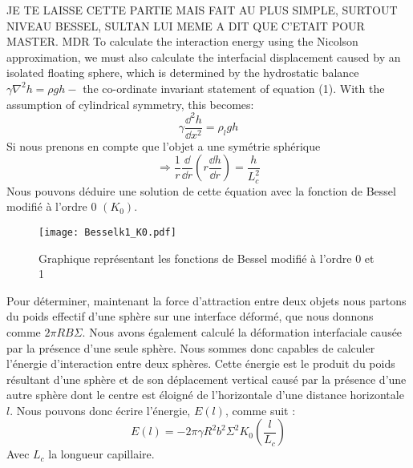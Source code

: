         JE TE LAISSE CETTE PARTIE MAIS FAIT AU PLUS SIMPLE, SURTOUT NIVEAU BESSEL, SULTAN LUI MEME A DIT QUE C'ETAIT POUR MASTER. MDR 
        To calculate the interaction energy using the Nicolson approximation, we must also calculate the interfacial displacement caused by an isolated floating sphere, which is determined by the hydrostatic balance \(\gamma\nabla^2h = \rho gh -\) the co-ordinate invariant statement of equation (1). With the assumption of cylindrical symmetry, this becomes:
        \begin{equation}
            \gamma \frac{\dd^2h}{\dd x^2} = \rho_l g h
        \end{equation}
        Si nous prenons en compte que l'objet a une symétrie sphérique
        \begin{equation}
            \Rightarrow \frac{1}{r} \frac{\dd}{\dd r} \left( r\frac{\dd h}{\dd r}\right) = \frac{h}{L_c^2}
        \end{equation}
        Nous pouvons déduire une solution de cette équation avec la fonction de Bessel modifié à l'ordre 0 $(K_0)$\cite{introtoBessel}.

        \begin{figure}[H]
            \centering
            \texttt{[image: Besselk1\_K0.pdf]}
            \caption{Graphique représentant les fonctions de Bessel modifié à l'ordre 0 et 1}
        \end{figure}

        Pour déterminer, maintenant la force d'attraction entre deux objets nous partons du poids effectif d'une sphère sur une interface déformé, que nous donnons comme \(2\pi RB\Sigma\). Nous avons également calculé la déformation interfaciale causée
        par la présence d'une seule sphère. Nous sommes donc capables de calculer l'énergie d'interaction entre deux sphères. Cette énergie est le produit du poids résultant d'une sphère et de son déplacement vertical causé par la présence d'une autre sphère dont le centre est éloigné de l'horizontale d'une distance horizontale $l$. Nous pouvons donc écrire l'énergie, $E(l)$, comme suit :
        \begin{equation}
            E(l)=-2\pi\gamma R^2b^2\Sigma^2K_0\left(\frac{l}{L_c}\right)
            \label{eq:energyInteraction}
        \end{equation}
        Avec $L_c$ la longueur capillaire.

